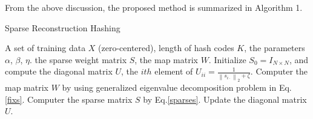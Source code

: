 \documentclass{sig-alternate}
\begin{document}
From the above discussion, the proposed method is summarized in Algorithm 1.
\begin{algorithm}[htb]
\caption{Sparse Reconstruction Hashing}
\label{alg1}
\begin{algorithmic}[1]
\REQUIRE A set of training data $X$ (zero-centered), length of hash codes $K$, the parameters $\alpha$, $\beta$, $\eta$.
\ENSURE the sparse weight matrix $S$, the map matrix $W$.
\STATE Initialize $S_0=I_{N \times N}$, and compute the diagonal matrix $U$, the $ith$ element of $U_{ii}=\frac{1}{\left \| s_{i\cdot}\right \|_2+\zeta}$.
\REPEAT
\STATE Computer the map matrix $W$ by using generalized eigenvalue decomposition problem in Eq.\ref{fixs}.
\STATE Computer the sparse matrix $S$ by Eq.\ref{sparses}.
\STATE Update the diagonal matrix $U$.
\end{algorithmic}
\end{algorithm}
\end{document}
